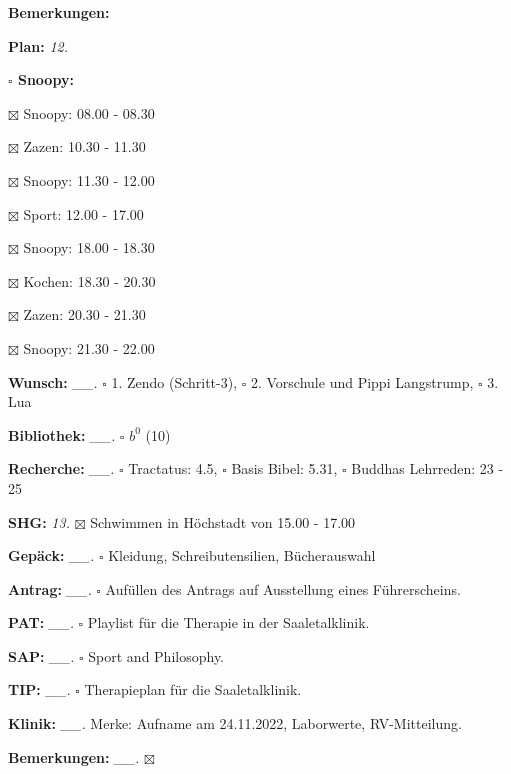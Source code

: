 \documentclass[10pt,a4paper]{article}
\newcommand\prop[1] {{\color {alizarin} {\bf #1}}}             %
\newcommand\opti[1] {{\color {amethyst} {\bf #1}}}             %
\newcommand\mand[1] {{\color {burntorange} {\bf #1}}}          %
\newcommand\topspace{\vskip -15pt \hskip 20pt}
\newcommand\bottomspace{\vskip 4pt}
\newcommand\n[1] { {\sl #1.} \hskip 5pt }
\begin{document}
\begin{mdframed}[style=daystyle]
\begin{labeling}{{\mand {Bemerkungen:}}}
  \item[{\mand {Plan:}}]           \n{12}
    \topspace
    \begin{minipage}{0.75\textwidth}  
      \begin{labeling}{\prop {$\square$ {Snoopy:}}} 
        \setlength\itemsep{-3pt}
      \item[$\boxtimes$ Snoopy:] 08.00 - 08.30
      \item[$\boxtimes$ Zazen:]  10.30 - 11.30
        
      \item[$\boxtimes$ Snoopy:] 11.30 - 12.00
      \item[$\boxtimes$ Sport:]  12.00 - 17.00        
        
      \item[$\boxtimes$ Snoopy:] 18.00 - 18.30
      \item[$\boxtimes$ Kochen:] 18.30 - 20.30
        
      \item[$\boxtimes$ Zazen:]  20.30 - 21.30
      \item[$\boxtimes$ Snoopy:] 21.30 - 22.00
      \end{labeling}
    \end{minipage}
    \bottomspace
  \item[{\mand {Wunsch:}}]       \n{\_\_} $\square$ 1. Zendo (Schritt-3),
      $\square$ 2. Vorschule und Pippi Langstrump, $\square$ 3. Lua
  \item[{\mand {Bibliothek:}}]   \n{\_\_} $\square$ $b^{0}$ (10)
  \item[{\mand {Recherche:}}]    \n{\_\_} $\square$ Tractatus: 4.5, $\square$ Basis Bibel: 5.31,
      $\square$ Buddhas Lehrreden: 23 - 25
  \item[{\mand {SHG:}}]            \n{13} $\boxtimes$ Schwimmen in Höchstadt von 15.00 - 17.00
  \item[{\mand {Gepäck:}}]       \n{\_\_} $\square$ Kleidung, Schreibutensilien, Bücherauswahl
  \item[{\opti {Antrag:}}]       \n{\_\_} $\square$ Aufüllen des Antrags auf Ausstellung eines Führerscheins.
  \item[{\opti {PAT:}}]          \n{\_\_} $\square$ Playlist für die Therapie in der Saaletalklinik.
  \item[{\opti {SAP:}}]          \n{\_\_} $\square$ Sport and Philosophy.
  \item[{\opti {TIP:}}]          \n{\_\_} $\square$ Therapieplan für die Saaletalklinik.
  \item[{\opti {Klinik:}}]       \n{\_\_} Merke: Aufname am 24.11.2022, Laborwerte, RV-Mitteilung.
  \item[{\mand {Bemerkungen:}}]  \n{\_\_} $\boxtimes$
  \end{labeling}
    

\end{mdframed}
\end{document}
